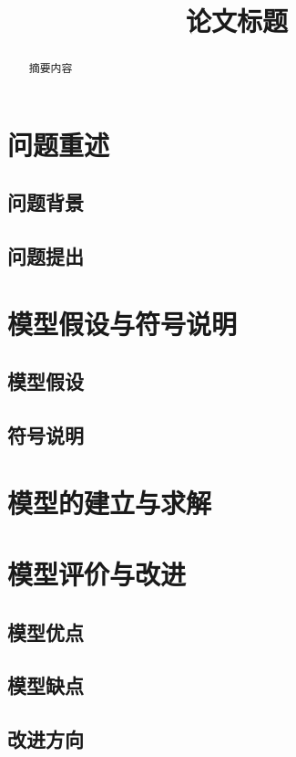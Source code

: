 \documentclass[withoutpreface,bwprint]{cumcmthesis}
\title{论文标题}
\begin{document}
\maketitle

\begin{abstract}
摘要内容
\end{abstract}

\section{问题重述}
\subsection{问题背景}

\subsection{问题提出}

\section{模型假设与符号说明}
\subsection{模型假设}
\subsection{符号说明}

\section{模型的建立与求解}

\section{模型评价与改进}
\subsection{模型优点}
\subsection{模型缺点}
\subsection{改进方向}



\newpage
\appendix
\end{document}
